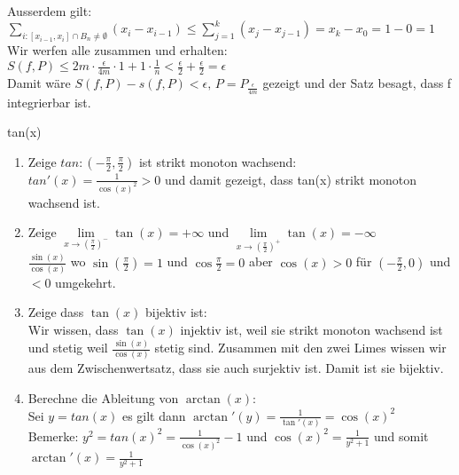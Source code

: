 \documentclass[a4paper,10pt]{article}
\begin{document}
\begin{subbox}{}
  Ausserdem gilt:\\
  $\underset{i: [x_{i-1}, x_i]\cap B_n \neq \emptyset}{\sum}(x_i - x_{i-1}) \leq \sum_{j = 1}^{k}(x_j - x_{j-1}) = x_k - x_0 = 1 - 0 = 1$\\
  Wir werfen alle zusammen und erhalten:\\
  $S(f,P) \leq 2m\cdot \frac{\epsilon}{4m}\cdot 1+1\cdot\frac{1}{n} < \frac{\epsilon}{2}+\frac{\epsilon}{2} = \epsilon$\\
  Damit wäre $S(f,P) - s(f,P) < \epsilon, \, P = P_\frac{\epsilon}{4m}$ gezeigt und der Satz besagt, dass f integrierbar ist.
\end{subbox}

\begin{subbox}{tan(x)}
  \begin{enumerate}
    \item Zeige $tan: (-\frac{\pi}{2}, \frac{\pi}{2})$ ist strikt monoton wachsend:\\
    $tan'(x) = \frac{1}{\cos(x)^2} > 0$ und damit gezeigt, dass tan(x) strikt monoton wachsend ist.
    \item Zeige $\underset{x\to(\frac{\pi}{2})^-}{\lim}\tan(x) = +\infty$ und $\underset{x\to(\frac{\pi}{2})^+}{\lim}\tan(x) = -\infty$\\
    $\frac{\sin(x)}{\cos(x)}$ wo $\sin(\frac{\pi}{2}) = 1$ und $\cos{\frac{\pi}{2}} = 0$ aber $\cos(x) > 0$ für $(-\frac{\pi}{2}, 0)$ und $<0$ umgekehrt. 
    \item Zeige dass $\tan(x)$ bijektiv ist:\\
    Wir wissen, dass $\tan(x)$ injektiv ist, weil sie strikt monoton wachsend ist und stetig weil $\frac{\sin(x)}{\cos(x)}$ stetig sind. Zusammen mit den zwei Limes wissen wir aus dem Zwischenwertsatz, dass sie auch surjektiv ist. Damit ist sie bijektiv.
    \item Berechne die Ableitung von $\arctan(x)$:\\
    Sei $y = tan(x)$ es gilt dann $\arctan'(y) = \frac{1}{\tan'(x)} = \cos(x)^2$\\
    Bemerke: $y^2 = tan(x)^2 = \frac{1}{\cos(x)^2}-1$ und $\cos(x)^2 = \frac{1}{y^2 +1}$ und somit $\arctan'(x) = \frac{1}{y^2 + 1}$
  \end{enumerate}
\end{subbox}
\end{document}
